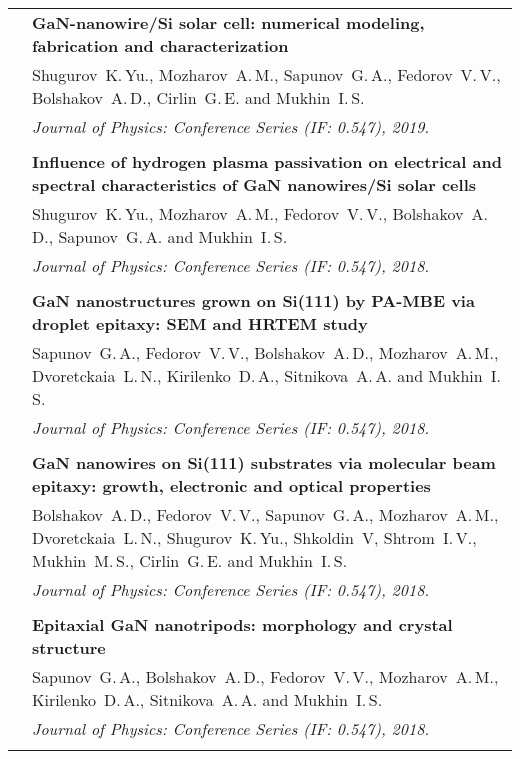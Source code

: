 \documentclass[letterpaper, 11pt]{article}
\begin{document}
\begin{longtable}{p{1.3in}p{4.8in}}
        & \textbf{GaN-nanowire/Si solar cell: numerical modeling, fabrication
        and characterization} \\
        & Shugurov~K.\,Yu., Mozharov~A.\,M., Sapunov~G.\,A., Fedorov~V.\,V.,
        Bolshakov~A.\,D., Cirlin~G.\,E. and Mukhin~I.\,S. \\
		& \textit{Journal of Physics: Conference Series (IF: 0.547), 2019.}\\
		& \\
		
        & \textbf{Influence of hydrogen plasma passivation on electrical and
        spectral characteristics of GaN nanowires/Si solar cells} \\
        & Shugurov~K.\,Yu., Mozharov~A.\,M., Fedorov~V.\,V., Bolshakov~A.\,D.,
        Sapunov~G.\,A. and Mukhin~I.\,S. \\
		& \textit{Journal of Physics: Conference Series (IF: 0.547), 2018.}\\
		& \\
		
        & \textbf{GaN nanostructures grown on Si(111) by PA-MBE via droplet
        epitaxy: SEM and HRTEM study} \\
        & Sapunov~G.\,A., Fedorov~V.\,V., Bolshakov~A.\,D., Mozharov~A.\,M.,
        Dvoretckaia~L.\,N., Kirilenko~D.\,A., Sitnikova~A.\,A. and
        Mukhin~I.\,S. \\
		& \textit{Journal of Physics: Conference Series (IF: 0.547), 2018.}\\
		& \\
		
        & \textbf{GaN nanowires on Si(111) substrates via molecular beam
        epitaxy: growth, electronic and optical properties} \\
        & Bolshakov~A.\,D., Fedorov~V.\,V., Sapunov~G.\,A., Mozharov~A.\,M.,
        Dvoretckaia~L.\,N., Shugurov~K.\,Yu., Shkoldin~V, Shtrom~I.\,V.,
        Mukhin~M.\,S., Cirlin~G.\,E. and Mukhin~I.\,S. \\
		& \textit{Journal of Physics: Conference Series (IF: 0.547), 2018.}\\
		& \\
		
        & \textbf{Epitaxial GaN nanotripods: morphology and crystal structure}
        \\
        & Sapunov~G.\,A., Bolshakov~A.\,D., Fedorov~V.\,V.,  Mozharov~A.\,M.,
        Kirilenko~D.\,A., Sitnikova~A.\,A. and Mukhin~I.\,S. \\
		& \textit{Journal of Physics: Conference Series (IF: 0.547), 2018.}\\
		& \\
		

\end{longtable}
\end{document}
